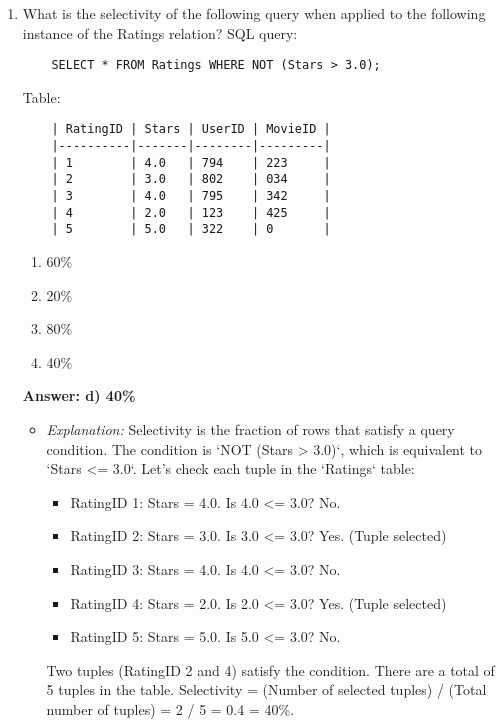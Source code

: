 \documentclass{article}
\begin{document}
\begin{enumerate}[label=\textbf{Question \arabic*.}]
\item What is the selectivity of the following query when applied to the following instance of the Ratings relation?
    SQL query:
    \begin{verbatim}
    SELECT * FROM Ratings WHERE NOT (Stars > 3.0);
    \end{verbatim}
    Table:
    \begin{verbatim}
    | RatingID | Stars | UserID | MovieID |
    |----------|-------|--------|---------|
    | 1        | 4.0   | 794    | 223     |
    | 2        | 3.0   | 802    | 034     |
    | 3        | 4.0   | 795    | 342     |
    | 4        | 2.0   | 123    | 425     |
    | 5        | 5.0   | 322    | 0       |
    \end{verbatim}
    \begin{enumerate}[label=\alph*)]
        \item 60\%
        \item 20\%
        \item 80\%
        \item 40\%
    \end{enumerate}
    \textbf{Answer: d) 40\%}
    \begin{itemize}
        \item \textit{Explanation:} Selectivity is the fraction of rows that satisfy a query condition.
        The condition is `NOT (Stars > 3.0)`, which is equivalent to `Stars <= 3.0`.
        Let's check each tuple in the `Ratings` table:
        \begin{itemize}
            \item RatingID 1: Stars = 4.0. Is 4.0 <= 3.0? No.
            \item RatingID 2: Stars = 3.0. Is 3.0 <= 3.0? Yes. (Tuple selected)
            \item RatingID 3: Stars = 4.0. Is 4.0 <= 3.0? No.
            \item RatingID 4: Stars = 2.0. Is 2.0 <= 3.0? Yes. (Tuple selected)
            \item RatingID 5: Stars = 5.0. Is 5.0 <= 3.0? No.
        \end{itemize}
        Two tuples (RatingID 2 and 4) satisfy the condition.
        There are a total of 5 tuples in the table.
        Selectivity = (Number of selected tuples) / (Total number of tuples) = 2 / 5 = 0.4 = 40\%.
    \end{itemize}


\end{enumerate}
\end{document}
